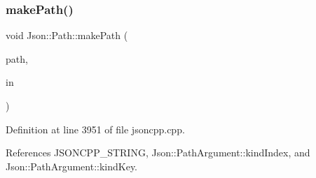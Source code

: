 \subsubsection{\texorpdfstring{make\+Path()}{makePath()}}
{\footnotesize\ttfamily void Json\+::\+Path\+::make\+Path (\begin{DoxyParamCaption}\item[{const \hyperlink{json_8h_a1e723f95759de062585bc4a8fd3fa4be}{J\+S\+O\+N\+C\+P\+P\+\_\+\+S\+T\+R\+I\+NG} \&}]{path,  }\item[{const \hyperlink{class_json_1_1_path_ab29d7b2fc896c7d3c5ed4609af3a3f23}{In\+Args} \&}]{in }\end{DoxyParamCaption})\hspace{0.3cm}{\ttfamily [private]}}



Definition at line 3951 of file jsoncpp.\+cpp.



References J\+S\+O\+N\+C\+P\+P\+\_\+\+S\+T\+R\+I\+NG, Json\+::\+Path\+Argument\+::kind\+Index, and Json\+::\+Path\+Argument\+::kind\+Key.


